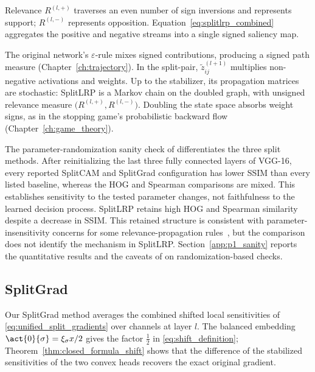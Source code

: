 Relevance $R^{(l,+)}$ traverses an even number of sign inversions and represents support; $R^{(l,-)}$ represents opposition. Equation~\eqref{eq:splitlrp_combined} aggregates the positive and negative streams into a single signed saliency map.

\begin{remark}\label{rem:splitlrp_markov}
The original network's $\varepsilon$-rule mixes signed contributions, producing a signed path measure (Chapter~\ref{ch:trajectory}). In the split-pair, $\tilde{z}^{(l+1)}_{ij}$ multiplies non-negative activations and weights. Up to the stabilizer, its propagation matrices are stochastic: SplitLRP is a Markov chain on the doubled graph, with unsigned relevance measure $\bigl(R^{(l,+)},R^{(l,-)}\bigr)$. Doubling the state space absorbs weight signs, as in the stopping game's probabilistic backward flow (Chapter~\ref{ch:game_theory}).
\end{remark}

\begin{remark}\label{rem:splitlrp_sanity}
The parameter-randomization sanity check of \textcite{Adebayo2018sanity} differentiates the three split methods. After reinitializing the last three fully connected layers of VGG-16, every reported SplitCAM and SplitGrad configuration has lower SSIM than every listed baseline, whereas the HOG and Spearman comparisons are mixed. This establishes sensitivity to the tested parameter changes, not faithfulness to the learned decision process. SplitLRP retains high HOG and Spearman similarity despite a decrease in SSIM. This retained structure is consistent with parameter-insensitivity concerns for some relevance-propagation rules~\parencite{sixt2020whenexplanationslie}, but the comparison does not identify the mechanism in SplitLRP. Section~\ref{app:p1_sanity} reports the quantitative results and the caveats of \textcite{Binder2022shortcomings} on randomization-based checks.
\end{remark}

\subsection{SplitGrad}\label{sec:split_grad}

Our SplitGrad method averages the combined shifted local sensitivities of \eqref{eq:unified_split_gradients} over channels at layer $l$. The balanced embedding $\act{0}{\sigma}=\xi_\sigma x/2$ gives the factor $\tfrac12$ in \eqref{eq:shift_definition}; Theorem~\ref{thm:closed_formula_shift} shows that the difference of the stabilized sensitivities of the two convex heads recovers the exact original gradient.

